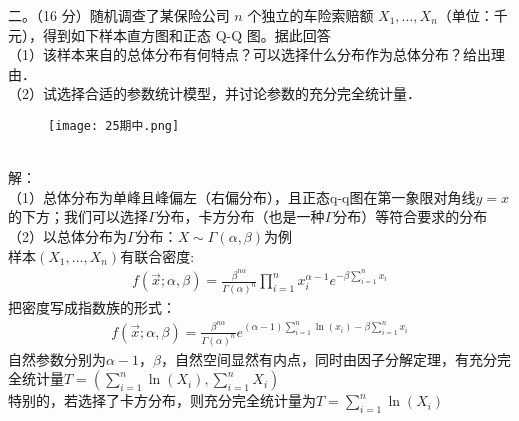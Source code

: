 \documentclass[UTF8,openany]{book}
\begin{document}
	
	\noindent 二。（16 分）随机调查了某保险公司 $n$ 个独立的车险索赔额 $X_{1}, \ldots, X_{n}$（单位：千元），得到如下样本直方图和正态 Q-Q 图。据此回答\\
	（1）该样本来自的总体分布有何特点？可以选择什么分布作为总体分布？给出理由．\\
	（2）试选择合适的参数统计模型，并讨论参数的充分完全统计量．\\
	\begin{figure}[h]  
		\centering  
		\texttt{[image: 25期中.png]}  
		\label{fig:my_label}  
	\end{figure}
	\\
	解：\\
	（1）总体分布为单峰且峰偏左（右偏分布），且正态q-q图在第一象限对角线$y=x$的下方；我们可以选择$\Gamma$分布，卡方分布（也是一种$\Gamma$分布）等符合要求的分布\\
	（2）以总体分布为$\Gamma$分布：$X \sim \Gamma(\alpha,\beta)$为例\\
	样本$(X_1,...,X_n)$有联合密度:
	\begin{gather}
		f(\vec{x};\alpha,\beta)=\frac{\beta^{n\alpha}}{\Gamma(\alpha)^n} \prod_{i=1}^{n} x_i^{\alpha-1} e^{-\beta \sum_{i=1}^{n} x_i}
	\end{gather}
	把密度写成指数族的形式：\\
	\begin{gather}
		f(\vec{x};\alpha,\beta)=\frac{\beta^{n\alpha}}{\Gamma(\alpha)^n} e^{(\alpha-1)\sum_{i=1}^n \ln(x_i)-\beta\sum_{i=1}^n x_i}
	\end{gather}
	自然参数分别为$\alpha-1$，$\beta$，自然空间显然有内点，同时由因子分解定理，有充分完全统计量$T=\left( \sum\limits_{i=1}^n \ln(X_i),\sum\limits_{i=1}^n X_i\right) $\\
	特别的，若选择了卡方分布，则充分完全统计量为$T=\sum\limits_{i=1}^n \ln(X_i)$\\
	
\end{document}
